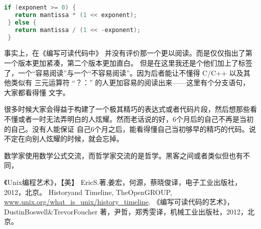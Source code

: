 \documentclass{ctexart}
\begin{document}
    \begin{lstlisting}[caption=容易阅读的代码,language=C++]
 if (exponent >= 0) {
   return mantissa * (1 << exponent);
 } else {
   return mantissa / (1 << -exponent);
 }
    \end{lstlisting}
    事实上，在《编写可读代码中》 并没有评价那一个更以阅读。而是仅仅指出了第一个版本更加紧凑，第二个版本更加直白。
    但是在这里我还是个他们加上了标签了，一个“容易阅读”与一个“不容易阅读”。因为后者能让不懂得 C/C++ 以及其他类似有 三元运算符 “？：” 的人更加容易的阅读出来——这里有个分支语句，
    大家都看得懂 文字。

    很多时候大家会得益于构建了一个极其精巧的表达式或者代码片段，然后想那些看不懂或者一时无法弄明白的人炫耀。然而老话说的好，6个月后的自己不再是当初的自己。没有人能保证
    自己6个月之后，能看得懂自己当初够早的精巧的代码。说不定在向别人炫耀的时候，就会忘掉。
    
    数学家使用数学公式交流，而哲学家交流的是哲学。黑客之间或者类似但也有不同，
    

    \begin{thebibliography}{0}
        《Unix编程艺术》，【美】 Eric\space S.\spaceRaymond 著,姜宏，何源，蔡晓俊\space 译，电子工业出版社，2012，北京。
         History\space and \space Timeline, The\space Open\space GROUP,
          \href{http://www.unix.org/what_is_unix/history_timeline.html}{www.unix.org/what\_is\_unix/history\_timeline}.
         《编写可读代码的艺术》，Dustin\space Boswell\&Trevor\space Foucher 著，尹哲，郑秀雯\space 译，机械工业出版社，2012，北京。
    \end{thebibliography}
        
\end{document}
